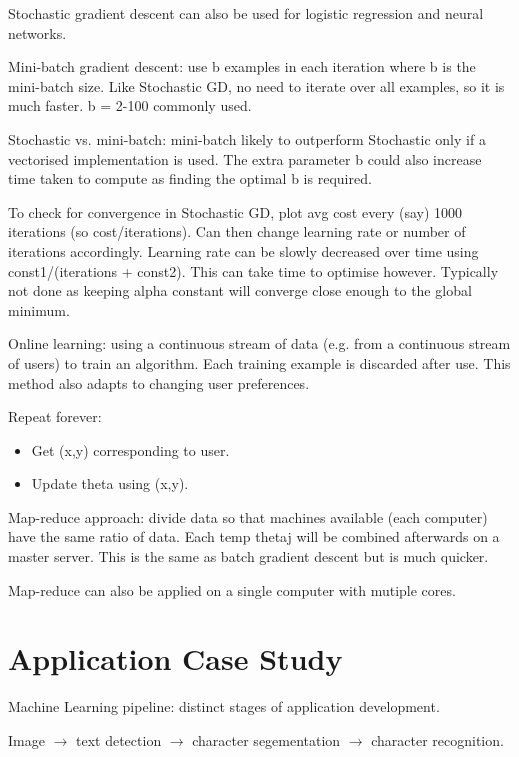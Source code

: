 \documentclass[12pt] {article}
\begin{document}
{  Stochastic gradient descent can also be used for logistic regression and
  neural networks.

  Mini-batch gradient descent: use b examples in each iteration where b is
  the mini-batch size. Like Stochastic GD, no need to iterate over all 
  examples, so it is much faster. b = 2-100 commonly used. 

  Stochastic vs. mini-batch: mini-batch likely to outperform Stochastic only
  if a vectorised implementation is used. The extra parameter b could also
  increase time taken to compute as finding the optimal b is required. 

  To check for convergence in Stochastic GD, plot avg cost every (say) 1000
  iterations (so cost/iterations). Can then change learning rate or number
  of iterations accordingly. Learning rate can be slowly decreased over 
  time using const1/(iterations + const2). This can take time to optimise
  however. Typically not done as keeping alpha constant will converge 
  close enough to the global minimum. 

  Online learning: using a continuous stream of data (e.g. from a continuous 
  stream of users) to train an algorithm. Each training example is discarded
  after use. This method also adapts to changing user preferences. 

  Repeat forever:
  \vspace{-1em}
  \begin{itemize}
  \item Get (x,y) corresponding to user.
  \item Update theta using (x,y).
  \end{itemize}

  Map-reduce approach: divide data so that machines available (each computer)
  have the same ratio of data. Each temp thetaj will be combined afterwards on
  a master server. This is the same as batch gradient descent but is much 
  quicker.
  
  Map-reduce can also be applied on a single computer with mutiple cores.
  
  \newpage
  
\section{Application Case Study}

  Machine Learning pipeline: distinct stages of application development.
  
  Image $\to$ text detection $\to$ character segementation $\to$ character 
  recognition.

}
\end{document}
